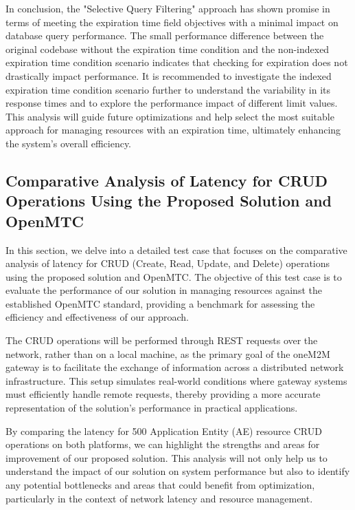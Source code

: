 \documentclass[a4paper,fleqn]{cas-dc}
\begin{document}
In conclusion, the "Selective Query Filtering" approach has shown promise in terms of meeting the expiration time field objectives with a minimal impact on database query performance. The small performance difference between the original codebase without the expiration time condition and the non-indexed expiration time condition scenario indicates that checking for expiration does not drastically impact performance. It is recommended to investigate the indexed expiration time condition scenario further to understand the variability in its response times and to explore the performance impact of different limit values. This analysis will guide future optimizations and help select the most suitable approach for managing resources with an expiration time, ultimately enhancing the system's overall efficiency.

\subsection{Comparative Analysis of Latency for CRUD Operations Using the Proposed Solution and OpenMTC}

In this section, we delve into a detailed test case that focuses on the comparative analysis of latency for CRUD (Create, Read, Update, and Delete) operations using the proposed solution and OpenMTC. The objective of this test case is to evaluate the performance of our solution in managing resources against the established OpenMTC standard, providing a benchmark for assessing the efficiency and effectiveness of our approach.

The CRUD operations will be performed through REST requests over the network, rather than on a local machine, as the primary goal of the oneM2M gateway is to facilitate the exchange of information across a distributed network infrastructure. This setup simulates real-world conditions where gateway systems must efficiently handle remote requests, thereby providing a more accurate representation of the solution's performance in practical applications.

By comparing the latency for 500 Application Entity (AE) resource CRUD operations on both platforms, we can highlight the strengths and areas for improvement of our proposed solution. This analysis will not only help us to understand the impact of our solution on system performance but also to identify any potential bottlenecks and areas that could benefit from optimization, particularly in the context of network latency and resource management.
\end{document}
